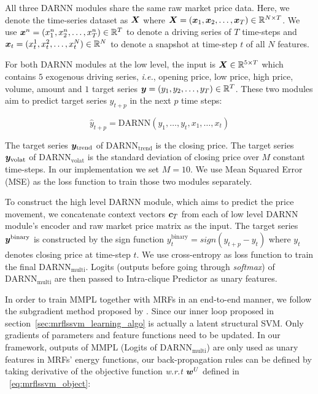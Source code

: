 All three DARNN modules share the same raw market price data.
Here, we denote the time-series dataset as ${\bm{X}}$ where
${\bm{X}}=({\bm{x}}_1,{\bm{x}}_2,\dots,{\bm{x}}_T)\in {\mathbb{R}}^{N\times T}$. We use
${\bm{x}}^n=(x_1^n,x_2^n,\dots,x_T^n) \in {\mathbb{R}}^T$ to denote a driving
series of $T$ time-steps and ${\bm{x}}_t=(x_t^1,x_t^2 ,\dots
,x_t^N)\in {\mathbb{R}}^N$ to denote a snapshot at time-step $t$ of all
$N$ features.

For both DARNN modules at the low level, the input is ${\bm{X}} \in {\mathbb{R}}^{5\times T}$
which contains $5$ exogenous driving series, \textit{i.e.}, opening price, low
price, high price, volume, amount and $1$ target series ${\bm{y}} =
(y_1,y_2,\dots,y_T) \in {\mathbb{R}}^T$. These two modules
aim to predict target series $y_{t+p}$ in the next $p$ time
steps:

$$\hat{y}_{t+p} = \text{DARNN}(y_1,\dots,y_{t},x_1,\dots,x_t)$$

The target series ${\bm{y}}_{\text{trend}}$ of
$\text{DARNN}_{\text{trend}}$ is the closing price. The target series
${\bm{y}}_{\text{volat}}$ of $\text{DARNN}_{\text{volat}}$ is the
standard deviation of closing price over $M$ constant time-steps.
In our implementation we set $M=10$. We use Mean Squared Error
(MSE) as the loss function to train those two modules separately.

To construct the high level DARNN module, which aims to predict
the price movement, we concatenate context vectors ${\bm{c}}_T$ from
each of low level DARNN module's encoder and raw market price
matrix as the input. The target series ${\bm{y}}^{\text{binary}}$ is
constructed by the sign function $y_t^{\text{binary}} =
sign(y_{t+p}-y_t)$ where $y_t$ denotes closing price at time-step
$t$. We use cross-entropy as loss function to train the final
$\text{DARNN}_{\text{multi}}$. Logits (outputs before going
through \emph{softmax}) of $\text{DARNN}_{\text{multi}}$ are then
passed to Intra-clique Predictor as unary features.

In order to train MMPL together with MRFs in an end-to-end
manner, we follow the subgradient method proposed by
. Since our inner loop
proposed in section~\ref{sec:mrflssvm_learning_algo} is actually
a latent structural SVM. Only gradients of parameters and feature
functions need to be updated. In our framework, outputs of
MMPL (Logits of $\text{DARNN}_{\text{multi}}$) are only used as unary features in MRFs' energy functions,
our back-propagation rules can be defined by taking derivative of the objective function \textit{w.r.t} ${\bm{w}}^U$  defined in
~\eqref{eq:mrflssvm_object}:

